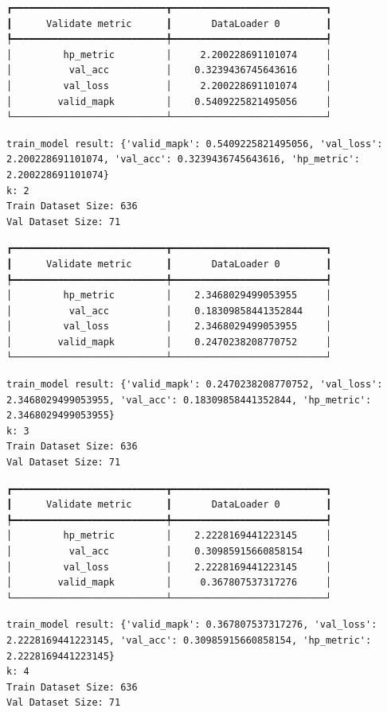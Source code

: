 \documentclass[
  letterpaper,
  DIV=11,
  numbers=noendperiod]{scrreprt}
\begin{document}
\begin{verbatim}
┏━━━━━━━━━━━━━━━━━━━━━━━━━━━┳━━━━━━━━━━━━━━━━━━━━━━━━━━━┓
┃      Validate metric      ┃       DataLoader 0        ┃
┡━━━━━━━━━━━━━━━━━━━━━━━━━━━╇━━━━━━━━━━━━━━━━━━━━━━━━━━━┩
│         hp_metric         │     2.200228691101074     │
│          val_acc          │    0.3239436745643616     │
│         val_loss          │     2.200228691101074     │
│        valid_mapk         │    0.5409225821495056     │
└───────────────────────────┴───────────────────────────┘
\end{verbatim}

\begin{verbatim}
train_model result: {'valid_mapk': 0.5409225821495056, 'val_loss': 2.200228691101074, 'val_acc': 0.3239436745643616, 'hp_metric': 2.200228691101074}
k: 2
Train Dataset Size: 636
Val Dataset Size: 71
\end{verbatim}

\begin{verbatim}
┏━━━━━━━━━━━━━━━━━━━━━━━━━━━┳━━━━━━━━━━━━━━━━━━━━━━━━━━━┓
┃      Validate metric      ┃       DataLoader 0        ┃
┡━━━━━━━━━━━━━━━━━━━━━━━━━━━╇━━━━━━━━━━━━━━━━━━━━━━━━━━━┩
│         hp_metric         │    2.3468029499053955     │
│          val_acc          │    0.18309858441352844    │
│         val_loss          │    2.3468029499053955     │
│        valid_mapk         │    0.2470238208770752     │
└───────────────────────────┴───────────────────────────┘
\end{verbatim}

\begin{verbatim}
train_model result: {'valid_mapk': 0.2470238208770752, 'val_loss': 2.3468029499053955, 'val_acc': 0.18309858441352844, 'hp_metric': 2.3468029499053955}
k: 3
Train Dataset Size: 636
Val Dataset Size: 71
\end{verbatim}

\begin{verbatim}
┏━━━━━━━━━━━━━━━━━━━━━━━━━━━┳━━━━━━━━━━━━━━━━━━━━━━━━━━━┓
┃      Validate metric      ┃       DataLoader 0        ┃
┡━━━━━━━━━━━━━━━━━━━━━━━━━━━╇━━━━━━━━━━━━━━━━━━━━━━━━━━━┩
│         hp_metric         │    2.2228169441223145     │
│          val_acc          │    0.30985915660858154    │
│         val_loss          │    2.2228169441223145     │
│        valid_mapk         │     0.367807537317276     │
└───────────────────────────┴───────────────────────────┘
\end{verbatim}

\begin{verbatim}
train_model result: {'valid_mapk': 0.367807537317276, 'val_loss': 2.2228169441223145, 'val_acc': 0.30985915660858154, 'hp_metric': 2.2228169441223145}
k: 4
Train Dataset Size: 636
Val Dataset Size: 71
\end{verbatim}
\end{document}
